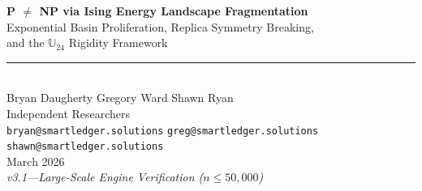 \documentclass[11pt,a4paper]{article}
\theoremstyle{plain}
\theoremstyle{definition}
\theoremstyle{remark}
\begin{document}
\thispagestyle{empty}


\vspace*{20pt}
\begin{center}

{\fontsize{22}{26}\selectfont\bfseries\color{accent}
P $\neq$ NP via Ising Energy Landscape Fragmentation\\[2pt]
}
{\large\color{accentlight}
Exponential Basin Proliferation, Replica Symmetry Breaking,\\
and the $\mathbb{U}_{24}$ Rigidity Framework}\\[20pt]

{\color{titlegold}\rule{6cm}{0.8pt}}\\[20pt]

{\Large Bryan Daugherty \quad Gregory Ward \quad Shawn Ryan}\\[8pt]
{\small\color{subtlegray}
Independent Researchers\\[2pt]
\texttt{bryan@smartledger.solutions}\quad
\texttt{greg@smartledger.solutions}\quad
\texttt{shawn@smartledger.solutions}}\\[16pt]

{\normalsize\color{subtlegray} March 2026}\\[6pt]
{\small\color{subtlegray}\itshape v3.1\enspace---\enspace Large-Scale Engine Verification ($n \leq 50{,}000$)}

\end{center}
\vspace{16pt}
\end{document}
